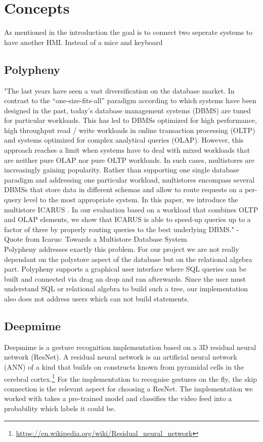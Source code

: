 \section{Concepts}
\label{g1:sec:concepts} %

As mentioned in the introduction the goal is to connect two seperate systems to have another HMI. Instead of a mice and keyboard 

\subsection{Polypheny}
"The last years have seen a vast diversification on the database market. In contrast to the “one-size-fits-all” paradigm according to which systems have been designed in the past, today’s database management systems (DBMS) are tuned for particular workloads. This has led to DBMSs optimized for high performance, high throughput read / write workloads in online transaction processing (OLTP) and systems optimized for complex analytical queries (OLAP). However, this approach reaches a limit when systems have to deal with mixed workloads that are neither pure OLAP nor pure OLTP workloads. In such cases, multistores are increasingly gaining popularity. Rather than supporting one single database paradigm and addressing one particular workload, multistores encompass several DBMSs that store data in different schemas and allow to route requests on a per-query level to the most appropriate system. In this paper, we introduce the multistore ICARUS . In our evaluation based on a workload that combines OLTP and OLAP elements, we show that ICARUS is able to speed-up queries up to a factor of three by properly routing queries to the best underlying DBMS." - Quote from Icarus: Towards a Multistore Database System
\newline
\\
Polypheny addresses exactly this problem. For our project we are not really dependant on the polystore aspect of the database but on the relational algebra part. Polypheny supports a graphical user interface where SQL queries can be built and connected via drag an drop and ran afterwards. Since the user must understand SQL or relational algebra to build such a tree, our implementation also does not address users which can not build statements.

\subsection{Deepmime}
Deepmime is a gesture recognition implementation based on a 3D residual neural network (ResNet). A residual neural network is an artificial neural network (ANN) of a kind that builds on constructs known from pyramidal cells in the cerebral cortex.\footnote{\url{https://en.wikipedia.org/wiki/Residual_neural_network}} For the implementation to recognise gestures on the fly, the skip connection is the relevant aspect for choosing a ResNet. The implementation we worked with takes a pre-trained model and classifies the video feed into a probability which labels it could be. 


